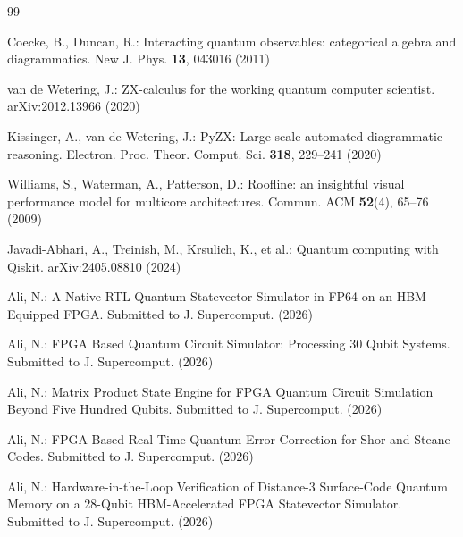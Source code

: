 \documentclass[pdflatex,sn-mathphys,Numbered]{sn-jnl}
\begin{document}
\begin{thebibliography}{99}

 Coecke, B., Duncan, R.: Interacting quantum observables: categorical algebra and diagrammatics. New J. Phys. \textbf{13}, 043016 (2011)

 van de Wetering, J.: ZX-calculus for the working quantum computer scientist. arXiv:2012.13966 (2020)

 Kissinger, A., van de Wetering, J.: PyZX: Large scale automated diagrammatic reasoning. Electron. Proc. Theor. Comput. Sci. \textbf{318}, 229--241 (2020)

 Williams, S., Waterman, A., Patterson, D.: Roofline: an insightful visual performance model for multicore architectures. Commun. ACM \textbf{52}(4), 65--76 (2009)

 Javadi-Abhari, A., Treinish, M., Krsulich, K., et al.: Quantum computing with Qiskit. arXiv:2405.08810 (2024)

 Ali, N.: A Native RTL Quantum Statevector Simulator in FP64 on an HBM-Equipped FPGA. Submitted to J. Supercomput. (2026)

 Ali, N.: FPGA Based Quantum Circuit Simulator: Processing 30 Qubit Systems. Submitted to J. Supercomput. (2026)

 Ali, N.: Matrix Product State Engine for FPGA Quantum Circuit Simulation Beyond Five Hundred Qubits. Submitted to J. Supercomput. (2026)

 Ali, N.: FPGA-Based Real-Time Quantum Error Correction for Shor and Steane Codes. Submitted to J. Supercomput. (2026)

 Ali, N.: Hardware-in-the-Loop Verification of Distance-3 Surface-Code Quantum Memory on a 28-Qubit HBM-Accelerated FPGA Statevector Simulator. Submitted to J. Supercomput. (2026)

\end{thebibliography}
\end{document}

